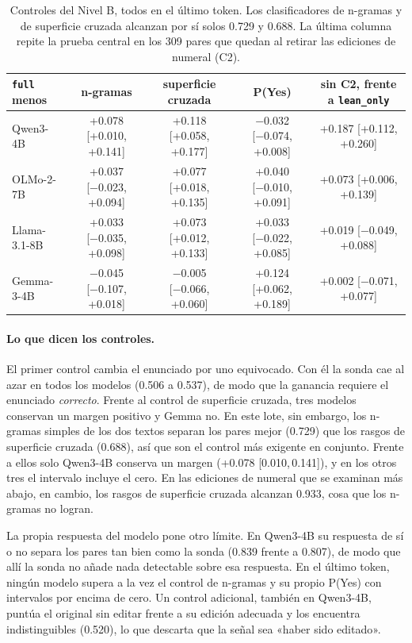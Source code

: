 \documentclass[10pt]{article}
\newcommand{\vr}[1]{\texttt{#1}}
\newcommand{\ic}[2]{[#1,\,#2]}
\begin{document}
\begin{table}[h]
\centering
\caption{Controles del Nivel B, todos en el último token. Los clasificadores de n-gramas y de superficie cruzada alcanzan por sí solos 0.729 y 0.688. La última columna repite la prueba central en los 309 pares que quedan al retirar las
ediciones de numeral (C2).}
\label{tab:bcontroles}
\vspace{2pt}
{\footnotesize\setlength{\tabcolsep}{3pt}
\begin{tabular}{@{}lcccc@{}}
\toprule
\vr{full} menos & n-gramas & superficie cruzada & P(Yes) & sin C2, frente a \vr{lean\_only}\\
\midrule
Qwen3-4B     & +0.078 [+0.010, +0.141] & +0.118 [+0.058, +0.177] & −0.032 [−0.074, +0.008] & +0.187 [+0.112, +0.260]\\
OLMo-2-7B    & +0.037 [−0.023, +0.094] & +0.077 [+0.018, +0.135] & +0.040 [−0.010, +0.091] & +0.073 [+0.006, +0.139]\\
Llama-3.1-8B & +0.033 [−0.035, +0.098] & +0.073 [+0.012, +0.133] & +0.033 [−0.022, +0.085] & +0.019 [−0.049, +0.088]\\
Gemma-3-4B   & −0.045 [−0.107, +0.018] & −0.005 [−0.066, +0.060] & +0.124 [+0.062, +0.189] & +0.002 [−0.071, +0.077]\\
\bottomrule
\end{tabular}}
\end{table}

\paragraph{Lo que dicen los controles.}
El primer control cambia el enunciado por uno equivocado. Con él la sonda cae al azar en todos los modelos (0.506 a
0.537), de modo que la ganancia requiere el enunciado \emph{correcto}. Frente al control de superficie cruzada, tres
modelos conservan un margen positivo y Gemma no. En este lote, sin embargo, los n-gramas simples de los dos textos
separan los pares mejor (0.729) que los rasgos de superficie cruzada (0.688), así que son el control más exigente
en conjunto. Frente a ellos solo Qwen3-4B conserva un margen (+0.078 \ic{0.010}{0.141}), y en los otros tres el
intervalo incluye el cero. En las ediciones de numeral que se examinan más abajo, en cambio, los rasgos de
superficie cruzada alcanzan 0.933, cosa que los n-gramas no logran.

La propia respuesta del modelo pone otro límite. En Qwen3-4B su respuesta de sí o no separa los pares tan bien como
la sonda (0.839 frente a 0.807), de modo que allí la sonda no añade nada detectable sobre esa respuesta. En el
último token, ningún modelo supera a la vez el control de n-gramas y su propio P(Yes) con intervalos por encima de
cero. Un control adicional, también en Qwen3-4B, puntúa el original sin editar frente a su edición adecuada y los
encuentra indistinguibles (0.520), lo que descarta que la señal sea «haber sido editado».
\end{document}
